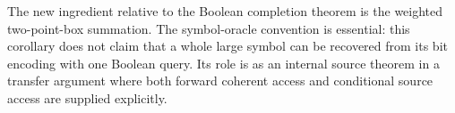 The new ingredient relative to the Boolean completion theorem is the
weighted two-point-box summation. The symbol-oracle convention is
essential: this corollary does not claim that a whole large symbol can
be recovered from its bit encoding with one Boolean query. Its role
is as an internal source theorem in a transfer argument where both
forward coherent access and conditional source access are supplied
explicitly.
